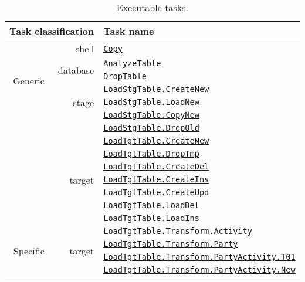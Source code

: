 \documentclass[a4paper,12pt,english,oneside]{book}
\begin{document}
\begin{table}%
\centering%
\begin{tabular}{r|r|l}%
\toprule%
\multicolumn{2}{r|}{\bf Task classification} & \bf Task name \\
\midrule
\multirow{6}{*}{Generic}
  & shell
    & \href{file:../tutorial/rep/bash/src/Copy.sh}{\tt Copy} \\
\cmidrule(l){2-3}
  & \multirow{2}{*}{database}
    & \href{file:../tutorial/rep/psql/src/AnalyzeTable.sql}{\tt AnalyzeTable} \\
  & & \href{file:../tutorial/rep/psql/src/DropTable.sql}{\tt DropTable} \\
\cmidrule(l){2-3}
  & \multirow{3}{*}{stage}
    & \href{file:../tutorial/rep/psql/src/LoadStgTable.CreateNew.sql}{\tt LoadStgTable.CreateNew} \\
  & & \href{file:../tutorial/rep/psql/src/LoadStgTable.LoadNew.sql}{\tt LoadStgTable.LoadNew} \\
  & & \href{file:../tutorial/rep/psql/src/LoadStgTable.CopyNew.sql}{\tt LoadStgTable.CopyNew} \\
  & & \href{file:../tutorial/rep/psql/src/LoadStgTable.DropOld.sql}{\tt LoadStgTable.DropOld} \\
\cmidrule(l){2-3}
  & \multirow{7}{*}{target}
    & \href{file:../tutorial/rep/psql/src/LoadTgtTable.CreateNew.sql}{\tt LoadTgtTable.CreateNew} \\
  & & \href{file:../tutorial/rep/psql/src/LoadTgtTable.DropTmp.sql}{\tt LoadTgtTable.DropTmp} \\
  & & \href{file:../tutorial/rep/psql/src/LoadTgtTable.CreateDel.sql}{\tt LoadTgtTable.CreateDel} \\
  & & \href{file:../tutorial/rep/psql/src/LoadTgtTable.CreateIns.sql}{\tt LoadTgtTable.CreateIns} \\
  & & \href{file:../tutorial/rep/psql/src/LoadTgtTable.CreateUpd.sql}{\tt LoadTgtTable.CreateUpd} \\
  & & \href{file:../tutorial/rep/psql/src/LoadTgtTable.LoadDel.sql}{\tt LoadTgtTable.LoadDel} \\
  & & \href{file:../tutorial/rep/psql/src/LoadTgtTable.LoadIns.sql}{\tt LoadTgtTable.LoadIns} \\
\midrule
\multirow{4}{*}{Specific}
  & \multirow{4}{*}{target}
    & \href{file:../tutorial/rep/psql/src/LoadTgtTable.Transform.Activity.sql}{\tt LoadTgtTable.Transform.Activity} \\
  & & \href{file:../tutorial/rep/psql/src/LoadTgtTable.Transform.Party.sql}{\tt LoadTgtTable.Transform.Party} \\
  & & \href{file:../tutorial/rep/psql/src/LoadTgtTable.Transform.PartyActivity.T01.sql}{\tt LoadTgtTable.Transform.PartyActivity.T01} \\
  & & \href{file:../tutorial/rep/psql/src/LoadTgtTable.Transform.PartyActivity.New.sql}{\tt LoadTgtTable.Transform.PartyActivity.New} \\
\bottomrule
\end{tabular}
\caption{Executable tasks.}
\end{table}
\end{document}

